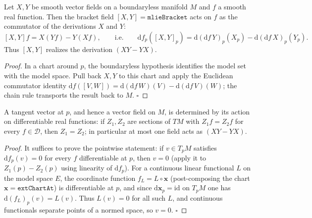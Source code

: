\begin{lemma}
  \label{lem:dc-ch0-5-2-commutator}
  \leanok
  Let $X,Y$ be smooth vector fields on a boundaryless manifold $M$ and $f$ a smooth
  real function. Then the bracket field $[X,Y]=\texttt{mlieBracket}$ acts on $f$ as the
  commutator of the derivations $X$ and $Y$:
  $$
  [X,Y]f = X(Yf)-Y(Xf), \qquad\text{i.e.}\qquad
  \mathrm{d}f_p([X,Y]_p) = \mathrm{d}(\mathrm{d}f\,Y)_p(X_p)-\mathrm{d}(\mathrm{d}f\,X)_p(Y_p).
  $$
  Thus $[X,Y]$ realizes the derivation $(XY-YX)$.
\end{lemma}
\begin{proof}
  \sketch
  \leanok
  In a chart around $p$, the boundaryless hypothesis identifies the model set with the
  model space. Pull back $X,Y$ to this chart and apply the Euclidean commutator identity
  $\mathrm{d}f([V,W])=\mathrm{d}(\mathrm{d}f\,W)(V)-\mathrm{d}(\mathrm{d}f\,V)(W)$;
  the chain rule transports the result back to $M$. $\square$
\end{proof}

\begin{lemma}
  \label{lem:dc-ch0-5-2-unique}
  \leanok
  A tangent vector at $p$, and hence a vector field on $M$, is determined by its
  action on differentiable real functions: if $Z_1,Z_2$ are sections of $TM$ with
  $Z_1f=Z_2f$ for every $f\in\mathcal{D}$, then $Z_1=Z_2$; in particular at most one
  field acts as $(XY-YX)$.
\end{lemma}
\begin{proof}
  \sketch
  \leanok
  It suffices to prove the pointwise statement: if $v\in T_pM$ satisfies
  $\mathrm{d}f_p(v)=0$ for every $f$ differentiable at $p$, then $v=0$
  (apply it to $Z_1(p)-Z_2(p)$ using linearity of $\mathrm{d}f_p$). For a
  continuous linear functional $L$ on the model space $E$, the coordinate function
  $f_L=L\circ\mathbf{x}$ (post-composing the chart $\mathbf{x}=\texttt{extChartAt}$)
  is differentiable at $p$, and since $\mathrm{d}\mathbf{x}_p=\mathrm{id}$ on
  $T_pM$ one has $\mathrm{d}(f_L)_p(v)=L(v)$. Thus $L(v)=0$ for all such $L$, and
  continuous functionals separate points of a normed space, so $v=0$. $\square$
\end{proof}

